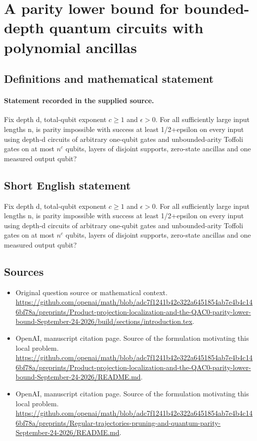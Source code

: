 \documentclass[11pt]{article}
\begin{document}
\section*{A parity lower bound for bounded-depth quantum circuits with polynomial ancillas}\label{statement}
\subsection{Definitions and mathematical statement}
\paragraph{Statement recorded in the supplied source.}
Fix depth d, total-qubit exponent $c\geq 1$ and $\epsilon >0$. For all sufficiently large input lengths n, is parity impossible with success at least 1/2+epsilon on every input using depth-d circuits of arbitrary one-qubit gates and unbounded-arity Toffoli gates on at most $n^c$ qubits, layers of disjoint supports, zero-state ancillas and one measured output qubit?
\subsection{Short English statement}
Fix depth d, total-qubit exponent $c\geq 1$ and $\epsilon >0$. For all sufficiently large input lengths n, is parity impossible with success at least 1/2+epsilon on every input using depth-d circuits of arbitrary one-qubit gates and unbounded-arity Toffoli gates on at most $n^c$ qubits, layers of disjoint supports, zero-state ancillas and one measured output qubit?
\subsection{Sources}
\begin{itemize}
\item[S1] Original question source or mathematical context.
\url{https://github.com/openai/math/blob/adc7f1241b42e322a6451854ab7e4b4c146bf78a/preprints/Product-projection-localization-and-the-QAC0-parity-lower-bound-September-24-2026/build/sections/introduction.tex}.
\item[S2] OpenAI, manuscript citation page. Source of the formulation motivating this local problem.
\url{https://github.com/openai/math/blob/adc7f1241b42e322a6451854ab7e4b4c146bf78a/preprints/Product-projection-localization-and-the-QAC0-parity-lower-bound-September-24-2026/README.md}.
\item[S3] OpenAI, manuscript citation page. Source of the formulation motivating this local problem.
\url{https://github.com/openai/math/blob/adc7f1241b42e322a6451854ab7e4b4c146bf78a/preprints/Regular-trajectories-pruning-and-quantum-parity-September-24-2026/README.md}.
\end{itemize}
\end{document}
